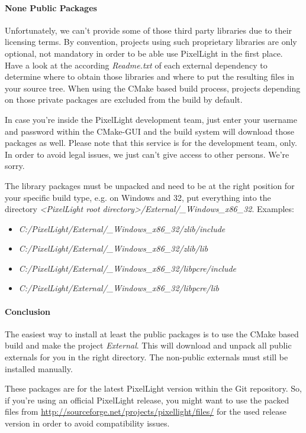 \paragraph{None Public Packages}
Unfortunately, we can't provide some of those third party libraries due to their licensing terms. By convention, projects using such proprietary libraries are only optional, not mandatory in order to be able use PixelLight in the first place. Have a look at the according \emph{Readme.txt} of each external dependency to determine where to obtain those libraries and where to put the resulting files in your source tree. When using the CMake based build process, projects depending on those private packages are excluded from the build by default.

In case you're inside the PixelLight development team, just enter your username and password within the CMake-GUI and the build system will download those packages as well. Please note that this service is for the development team, only. In order to avoid legal issues, we just can't give access to other persons. We're sorry.

The library packages must be unpacked and need to be at the right position for your specific build type, e.g. on Windows and \SI{32}{\bit}, put everything into the directory \emph{\textless PixelLight root directory\textgreater /External/\_Windows\_x86\_32}. Examples:
\begin{itemize}
\item{\emph{C:/PixelLight/External/\_Windows\_x86\_32/zlib/include}}
\item{\emph{C:/PixelLight/External/\_Windows\_x86\_32/zlib/lib}}
\item{\emph{C:/PixelLight/External/\_Windows\_x86\_32/libpcre/include}}
\item{\emph{C:/PixelLight/External/\_Windows\_x86\_32/libpcre/lib}}
\end{itemize}


\paragraph{Conclusion}
The easiest way to install at least the public packages is to use the CMake based build and make the project \emph{External}. This will download and unpack all public externals for you in the right directory. The non-public externals must still be installed manually.

These packages are for the latest PixelLight version within the Git repository. So, if you're using an official PixelLight release, you might want to use the packed files from \url{http://sourceforge.net/projects/pixellight/files/} for the used release version in order to avoid compatibility issues.